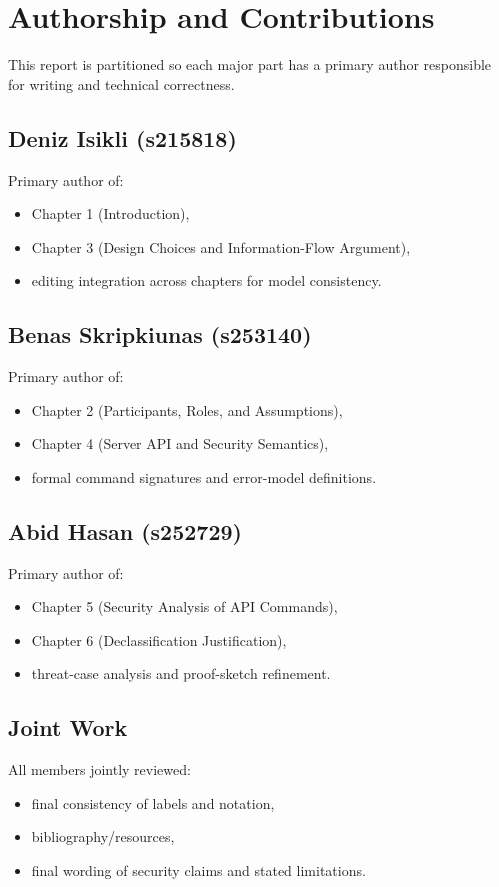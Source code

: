 \section{Authorship and Contributions}

This report is partitioned so each major part has a primary author responsible for writing and technical correctness.

\subsection*{Deniz Isikli (s215818)}
Primary author of:
\begin{itemize}
    \item Chapter 1 (Introduction),
    \item Chapter 3 (Design Choices and Information-Flow Argument),
    \item editing integration across chapters for model consistency.
\end{itemize}

\subsection*{Benas Skripkiunas (s253140)}
Primary author of:
\begin{itemize}
    \item Chapter 2 (Participants, Roles, and Assumptions),
    \item Chapter 4 (Server API and Security Semantics),
    \item formal command signatures and error-model definitions.
\end{itemize}

\subsection*{Abid Hasan (s252729)}
Primary author of:
\begin{itemize}
    \item Chapter 5 (Security Analysis of API Commands),
    \item Chapter 6 (Declassification Justification),
    \item threat-case analysis and proof-sketch refinement.
\end{itemize}

\subsection*{Joint Work}
All members jointly reviewed:
\begin{itemize}
    \item final consistency of labels and notation,
    \item bibliography/resources,
    \item final wording of security claims and stated limitations.
\end{itemize}


